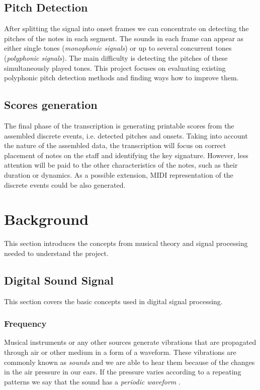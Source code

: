 \documentclass[11pt]{article} %
\begin{document}
\subsection{Pitch Detection}
After splitting the signal into onset frames we can concentrate on detecting the pitches of the notes in each segment. The sounds in each frame can appear as either single tones (\textit{monophonic signals}) or up to several concurrent tones (\textit{polyphonic signals}). The main difficulty is detecting the pitches of these simultaneously played tones. This project focuses on evaluating existing polyphonic pitch detection methods and finding ways how to improve them.

\subsection{Scores generation}
The final phase of the transcription is generating printable scores from the assembled discrete events, i.e. detected pitches and onsets. Taking into account the nature of the assembled data, the transcription will focus on correct placement of notes on the staff and identifying the key signature. However, less attention will be paid to the other characteristics of the notes, such as their duration or dynamics. As a possible extension, MIDI representation of the discrete events could be also generated. 

\section{Background}
This section introduces the concepts from musical theory and signal processing needed to understand the project. 


\subsection{Digital Sound Signal}
This section covers the basic concepts used in digital signal processing.

\subsubsection{Frequency}
Musical instruments or any other sources generate vibrations that are propagated through air or other medium in a form of a waveform. These vibrations are commonly known as \textit{sounds} and we are able to hear them because of the changes in the air pressure in our ears. If the pressure varies according to a repeating patterns we say that the sound has a \textit{periodic waveform} \citep*{Roads1996}.
\end{document}
